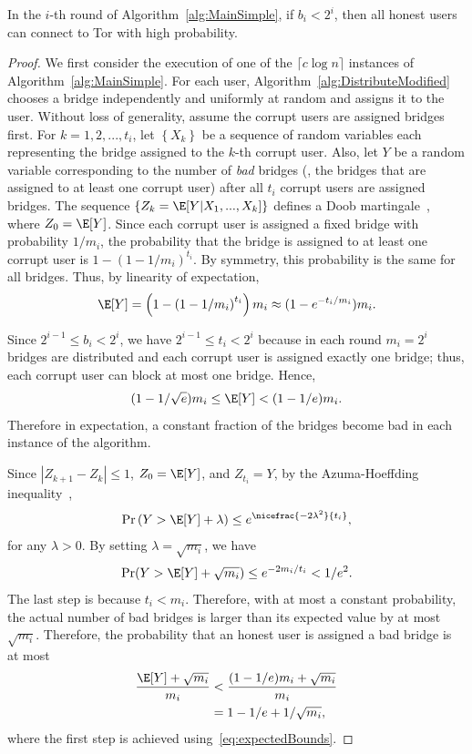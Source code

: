\begin{lemma} \label{lem:BasicWhp}
	In the $i$-th round of Algorithm~\ref{alg:MainSimple}, if ${b_i < 2^i}$, then all honest users can connect to Tor with high probability.
\end{lemma}
\begin{proof}
	We first consider the execution of one of the ${\lceil c\log{n} \rceil}$ instances of Algorithm~\ref{alg:MainSimple}. For each user, Algorithm~\ref{alg:DistributeModified} chooses a bridge independently and uniformly at random and assigns it to the user. Without loss of generality, assume the corrupt users are assigned bridges first.
	For ${k=1,2,...,t_i}$, let $\left\{X_k\right\}$ be a sequence of random variables each representing the bridge assigned to the $k$-th corrupt user. Also, let $Y$ be a random variable corresponding to the number of \emph{bad} bridges (\ie, the bridges that are assigned to at least one corrupt user) after all $t_i$ corrupt users are assigned bridges. The sequence ${\left\{Z_k = \E[Y|X_1,...,X_k]\right\}}$ defines a Doob martingale~\cite[Chapter~5]{dubhashi:2009}, where ${Z_0 = \E[Y]}$. 
	Since each corrupt user is assigned a fixed bridge with probability $1/m_i$, the probability that the bridge is assigned to at least one corrupt user is ${1-(1-1/m_i)^{t_i}}$. By symmetry, this probability is the same for all bridges. Thus, by linearity of expectation,
	\[\E[Y] = \left(1 - \left(1-1/m_i\right)^{t_i}\right)m_i \approx (1 - e^{-t_i/m_i})m_i.\]
	
	Since ${2^{i-1} \leq b_i < 2^i}$, we have ${2^{i-1} \leq t_i < 2^i}$ because in each round ${m_i = 2^i}$ bridges are distributed and each corrupt user is assigned exactly one bridge; thus, each corrupt user can block at most one bridge. Hence, 
	\begin{align}
		(1-1/\sqrt{e})m_i \leq \E[Y] < (1 - 1/e)m_i. \label{eq:expectedBounds}
	\end{align}
	Therefore in expectation, a constant fraction of the bridges become bad in each instance of the algorithm. 
	
	Since ${|Z_{k+1} - Z_k| \leq 1}$, ${Z_0 = \E[Y]}$, and ${Z_{t_i} = Y}$, by the Azuma-Hoeffding inequality~\cite[Theorem 5.2]{dubhashi:2009},
	\[\Pr\left(Y > \E[Y] + \lambda\right) \leq e^{\nicefrac{-2\lambda^2}{t_i}},\]
	for any ${\lambda > 0}$. 
	By setting ${\lambda = \sqrt{m_i}}$, we have
	\begin{align}
		\Pr(Y > \E[Y] + \sqrt{m_i}) \leq e^{-2m_i/t_i} < 1/e^2. \label{eq:p1}
	\end{align}
	The last step is because ${t_i < m_i}$. Therefore, with at most a constant probability, the actual number of bad bridges is larger than its expected value by at most $\sqrt{m_i}$. Therefore, the probability that an honest user is assigned a bad bridge is at most
	\begin{align}
		\frac{\E[Y] + \sqrt{m_i}}{m_i} &< \frac{(1-1/e)m_i + \sqrt{m_i}}{m_i} \nonumber \\ &= 1-1/e + 1/\sqrt{m_i}, \label{eq:p2}
	\end{align}
	where the first step is achieved using~\eqref{eq:expectedBounds}.
	

\end{proof}
